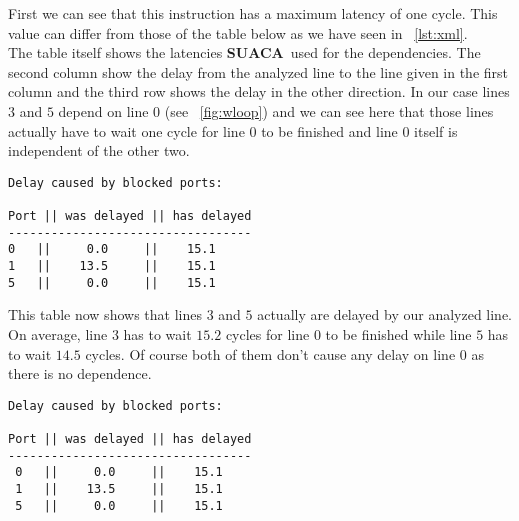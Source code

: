\documentclass[a4paper,12pt,titlepage, twoside]{report}
\newcommand{\suaca}{\textbf{SUACA}}
\begin{document}
First we can see that this instruction has a maximum latency of one cycle. This value can differ from those of the table below as we have seen in ~\autoref{lst:xml}.\\
The table itself shows the latencies \suaca\ used for the dependencies. The second column show the delay from the analyzed line to the line given in the first column and the third row shows the delay in the other direction. In our case lines $3$ and $5$ depend on line $0$ (see ~\autoref{fig:wloop}) and we can see here that those lines actually have to wait one cycle for line $0$ to be finished and line $0$ itself is independent of the other two.\\

\begin{mdframed}[backgroundcolor=light-gray, roundcorner=10pt,leftmargin=1, rightmargin=1, innerleftmargin=15, innertopmargin=15,innerbottommargin=15, outerlinewidth=1, linecolor=light-gray]
\begin{center}
\begin{BVerbatim}[fontsize=\scriptsize]
Delay caused by blocked ports:

Port || was delayed || has delayed
----------------------------------
0   ||     0.0     ||    15.1
1   ||    13.5     ||    15.1
5   ||     0.0     ||    15.1
\end{BVerbatim}
\end{center}
\end{mdframed}

This table now shows that lines $3$ and $5$ actually are delayed by our analyzed line. On average, line $3$ has to wait $15.2$ cycles for line $0$ to be finished while line $5$ has to wait $14.5$ cycles. Of course both of them don't cause any delay on line $0$ as there is no dependence.\\

\begin{mdframed}[backgroundcolor=light-gray, roundcorner=10pt,leftmargin=1, rightmargin=1, innerleftmargin=15, innertopmargin=15,innerbottommargin=15, outerlinewidth=1, linecolor=light-gray]
\begin{center}
\begin{BVerbatim}[fontsize=\scriptsize]
Delay caused by blocked ports:

Port || was delayed || has delayed
----------------------------------
 0   ||     0.0     ||    15.1
 1   ||    13.5     ||    15.1
 5   ||     0.0     ||    15.1
\end{BVerbatim}
\end{center}
\end{mdframed}
\end{document}
